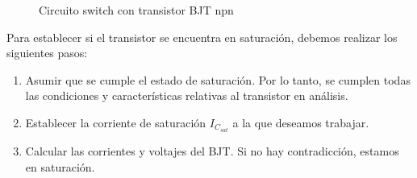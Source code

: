 \documentclass[11pt,fancy,lang=es]{elegantbook}
\begin{document}
\begin{figure}[!h]
    \centering
    \caption{Circuito switch con transistor BJT npn}
    \label{fig:switchBJT}
\end{figure}


Para establecer si el transistor se encuentra en saturación, debemos realizar los siguientes pasos:

\begin{enumerate}
    \item Asumir que se cumple el estado de saturación. Por lo tanto, se cumplen todas las condiciones y características relativas al transistor en análisis.
    \item Establecer la corriente de saturación $I_{C_{sat}}$ a la que deseamos trabajar.
    \item Calcular las corrientes y voltajes del BJT. Si no hay contradicción, estamos en saturación.
\end{enumerate}
\end{document}
